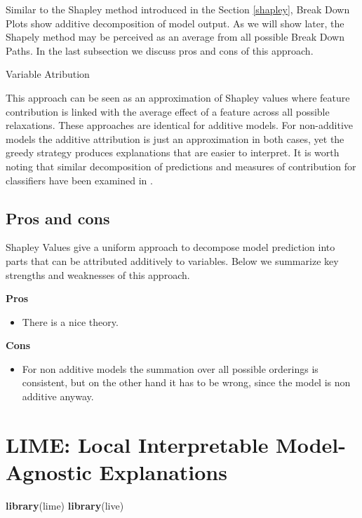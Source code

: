 \documentclass[]{book}
\newenvironment{Shaded}{\begin{snugshade}}{\end{snugshade}}
\newcommand{\KeywordTok}[1]{\textcolor[rgb]{0.13,0.29,0.53}{\textbf{#1}}}
\newcommand{\NormalTok}[1]{#1}
\providecommand{\tightlist}{%
  \setlength{\itemsep}{0pt}\setlength{\parskip}{0pt}}
\theoremstyle{definition}
\theoremstyle{definition}
\theoremstyle{definition}
\theoremstyle{remark}
\begin{document}
Similar to the Shapley method introduced in the Section \ref{shapley},
Break Down Plots show additive decomposition of model output. As we will
show later, the Shapely method may be perceived as an average from all
possible Break Down Paths. In the last subsection we discuss pros and
cons of this approach.

Variable Atribution

This approach can be seen as an approximation of Shapley values where
feature contribution is linked with the average effect of a feature
across all possible relaxations. These approaches are identical for
additive models. For non-additive models the additive attribution is
just an approximation in both cases, yet the greedy strategy produces
explanations that are easier to interpret. It is worth noting that
similar decomposition of predictions and measures of contribution for
classifiers have been examined in \cite{4407709}.

\hypertarget{pros-and-cons-2}{%
\section{Pros and cons}\label{pros-and-cons-2}}

Shapley Values give a uniform approach to decompose model prediction
into parts that can be attributed additively to variables. Below we
summarize key strengths and weaknesses of this approach.

\textbf{Pros}

\begin{itemize}
\tightlist
\item
  There is a nice theory.
\end{itemize}

\textbf{Cons}

\begin{itemize}
\tightlist
\item
  For non additive models the summation over all possible orderings is
  consistent, but on the other hand it has to be wrong, since the model
  is non additive anyway.
\end{itemize}

\hypertarget{LIME}{%
\chapter{LIME: Local Interpretable Model-Agnostic
Explanations}\label{LIME}}

\citep{R-lime} \citep{R-live}

\begin{Shaded}
\begin{Highlighting}[]
\KeywordTok{library}\NormalTok{(lime)}
\KeywordTok{library}\NormalTok{(live)}
\end{Highlighting}
\end{Shaded}
\end{document}
